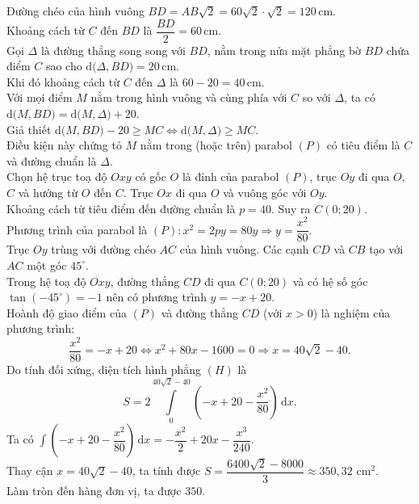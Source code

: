\begin{ex}
{\begin{center}
		\end{center}
		Đường chéo của hình vuông $BD = AB\sqrt{2} = 60\sqrt{2}\cdot\sqrt{2} = 120$\,cm.\\
		Khoảng cách từ $C$ đến $BD$ là $\dfrac{BD}{2} = 60$\,cm.\\
		Gọi $\Delta$ là đường thẳng song song với $BD$, nằm trong nửa mặt phẳng bờ $BD$ chứa điểm $C$ sao cho $\mathrm{d}\big(\Delta, BD\big) = 20$\,cm.\\
		Khi đó khoảng cách từ $C$ đến $\Delta$ là $60 - 20 = 40$\,cm.\\
		Với mọi điểm $M$ nằm trong hình vuông và cùng phía với $C$ so với $\Delta$, ta có $\mathrm{d}\big(M, BD\big) = \mathrm{d}\big(M, \Delta\big) + 20$.\\
		Giả thiết $\mathrm{d}\big(M, BD\big) - 20 \ge MC \Leftrightarrow \mathrm{d}\big(M, \Delta\big) \ge MC$.\\
		Điều kiện này chứng tỏ $M$ nằm trong (hoặc trên) parabol $(P)$ có tiêu điểm là $C$ và đường chuẩn là $\Delta$. \\
		Chọn hệ trục toạ độ $Oxy$ có gốc $O$ là đỉnh của parabol $(P)$, trục $Oy$ đi qua $O$, $C$ và hướng từ $O$ đến $C$. Trục $Ox$ đi qua $O$ và vuông góc với $Oy$.\\
		Khoảng cách từ tiêu điểm đến đường chuẩn là $p = 40$. Suy ra $C(0; 20)$.\\
		Phương trình của parabol là $(P)\colon x^2 = 2py = 80y \Rightarrow y = \dfrac{x^2}{80}$.\\
		Trục $Oy$ trùng với đường chéo $AC$ của hình vuông. Các cạnh $CD$ và $CB$ tạo với $AC$ một góc $45^\circ$.\\
		Trong hệ toạ độ $Oxy$, đường thẳng $CD$ đi qua $C(0; 20)$ và có hệ số góc $\tan(-45^\circ) = -1$ nên có phương trình $y = -x + 20$.\\
		Hoành độ giao điểm của $(P)$ và đường thẳng $CD$ (với $x > 0$) là nghiệm của phương trình:
		\[ \dfrac{x^2}{80} = -x + 20 \Leftrightarrow x^2 + 80x - 1600 = 0 \Rightarrow x = 40\sqrt{2} - 40. \]
		Do tính đối xứng, diện tích hình phẳng $(H)$ là
		\[ S = 2\displaystyle\int\limits_0^{40\sqrt{2}-40} \left(-x + 20 - \dfrac{x^2}{80}\right) \mathrm{\,d}x. \]
		Ta có $\displaystyle\int \left(-x + 20 - \dfrac{x^2}{80}\right) \mathrm{\,d}x = -\dfrac{x^2}{2} + 20x - \dfrac{x^3}{240}$.\\
		Thay cận $x = 40\sqrt{2} - 40$, ta tính được $S = \dfrac{6400\sqrt{2} - 8000}{3} \approx 350{,}32 \text{ cm}^2$.\\
		Làm tròn đến hàng đơn vị, ta được $350$.
	}
\end{ex}

